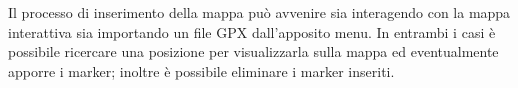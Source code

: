 \documentclass{natourDoc}
\begin{document}
\newpage
Il processo di inserimento della mappa può avvenire sia interagendo con la mappa interattiva sia importando
un file GPX dall'apposito menu. In entrambi i casi è possibile ricercare una posizione per visualizzarla sulla mappa
ed eventualmente apporre i marker; inoltre è possibile eliminare i marker inseriti.

\begin{figure}[htbp]
	\centering
	\begin{minipage}[t]{0.4\textwidth}

\end{minipage}
\end{figure}
\end{document}
